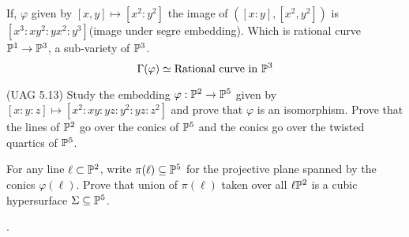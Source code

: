 \documentclass[12pt]{article}
\begin{document}
\vspace*{0.2cm}

\noindent If, $\varphi$ given by $[x,y]\mapsto [x^2:y^2]$ the image of $([x:y],[x^2,y^2])$ is $[x^3:xy^2:yx^2:y^3]$(image under segre embedding). Which is rational curve $\mathbb{P}^1 \to \mathbb{P}^3$, a sub-variety of $\mathbb{P}^3$.
$$\Gamma(\varphi)\simeq \text{Rational curve in }\mathbb{P}^3$$

\begin{prob} %
    (UAG 5.13) Study the embedding $\varphi : \mathbb{P}^2 \to \mathbb{P}^5$ given by $[x:y:z] \mapsto [x^2:xy:yz:y^2:yz:z^2]$ and prove that $\varphi$ is an isomorphism. Prove that the lines of $\mathbb{P}^2$ go over the conics of $\mathbb{P}^5$ and the conics go over the twisted quartics of $\mathbb{P}^5$.

    \vspace*{0.2cm}

    \noindent For any line $\ell \subset \mathbb{P}^2$, write $\pi(\ell) \subseteq \mathbb{P}^5$ for the projective plane spanned by the conics $\varphi(\ell)$. Prove that union of $\pi(\ell)$ taken over all $\ell \mathbb{P}^2$ is a cubic hypersurface $\Sigma \subseteq \mathbb{P}^5$.
\end{prob}

\sol. 
\end{document}
